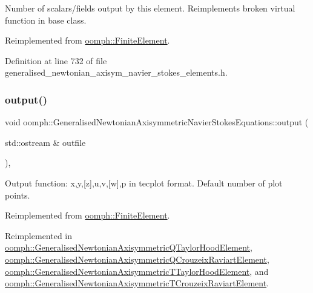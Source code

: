 Number of scalars/fields output by this element. Reimplements broken virtual function in base class. 



Reimplemented from \hyperlink{classoomph_1_1FiniteElement_a865e2e5586552ba80babdbe26a77fe8c}{oomph\+::\+Finite\+Element}.



Definition at line 732 of file generalised\+\_\+newtonian\+\_\+axisym\+\_\+navier\+\_\+stokes\+\_\+elements.\+h.

\mbox{\label{classoomph_1_1GeneralisedNewtonianAxisymmetricNavierStokesEquations_a25e906f89c3cec75081bd2fc88b37fd5}} 
\subsubsection{\texorpdfstring{output()}{output()}\hspace{0.1cm}{\footnotesize\ttfamily [1/4]}}
{\footnotesize\ttfamily void oomph\+::\+Generalised\+Newtonian\+Axisymmetric\+Navier\+Stokes\+Equations\+::output (\begin{DoxyParamCaption}\item[{std\+::ostream \&}]{outfile }\end{DoxyParamCaption})\hspace{0.3cm}{\ttfamily [inline]}, {\ttfamily [virtual]}}



Output function\+: x,y,\mbox{[}z\mbox{]},u,v,\mbox{[}w\mbox{]},p in tecplot format. Default number of plot points. 



Reimplemented from \hyperlink{classoomph_1_1FiniteElement_a2ad98a3d2ef4999f1bef62c0ff13f2a7}{oomph\+::\+Finite\+Element}.



Reimplemented in \hyperlink{classoomph_1_1GeneralisedNewtonianAxisymmetricQTaylorHoodElement_a2f949241b86234f5681385d35ee0716d}{oomph\+::\+Generalised\+Newtonian\+Axisymmetric\+Q\+Taylor\+Hood\+Element}, \hyperlink{classoomph_1_1GeneralisedNewtonianAxisymmetricQCrouzeixRaviartElement_ad4ddd436a6bb13b78e25abae6833ed72}{oomph\+::\+Generalised\+Newtonian\+Axisymmetric\+Q\+Crouzeix\+Raviart\+Element}, \hyperlink{classoomph_1_1GeneralisedNewtonianAxisymmetricTTaylorHoodElement_a27e5fdda8d9499f20b99f82443d37b78}{oomph\+::\+Generalised\+Newtonian\+Axisymmetric\+T\+Taylor\+Hood\+Element}, and \hyperlink{classoomph_1_1GeneralisedNewtonianAxisymmetricTCrouzeixRaviartElement_aa8244861e7f531652f105fabfc580efc}{oomph\+::\+Generalised\+Newtonian\+Axisymmetric\+T\+Crouzeix\+Raviart\+Element}.




